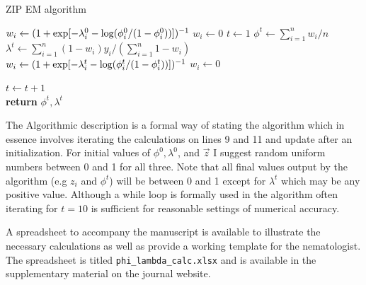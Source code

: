\documentclass{article}
\begin{document}
\begin{algorithm}
\caption{ZIP EM algorithm}\label{alg:zip_em}
\begin{algorithmic}[1]
  		\State $w_i \gets (1+\exp[-\lambda_i^0 -\textnormal{log}(\phi_i^0/(1-\phi_i^0))])^{-1}$ 
	\Else 
  		\State $w_i \gets 0$ 
 	\EndIf
\EndFor
\State $t \gets 1$
\State $\phi^t \gets \sum_{i=1}^nw_i/n $\\
\State $\lambda^t \gets \sum_{i=1}^n(1-w_i)y_i /(\sum_{i=1}^n1-w_i) $\\
  		\State $w_i \gets (1+\exp[-\lambda_i^t -\textnormal{log}(\phi_i^t/(1-\phi_i^t))])^{-1}$ 
	\Else 
  		\State $w_i \gets 0$ 
 	\EndIf
\EndFor

\State $t\gets t+1$\\
\EndWhile
\State \textbf{return} $\phi^t, \lambda^t$\\
\EndProcedure
\end{algorithmic}
\end{algorithm}
The Algorithmic description is a formal way of stating the algorithm which in essence involves iterating the calculations on lines 9 and 11 and update after an initialization. For initial values of $\phi^0, \lambda^0$, and $\vec{z}$ I suggest random uniform numbers between 0 and 1 for all three. Note that all final values output by the algorithm (e.g $z_i$ and $\phi^t$) will be between 0 and 1 except for $\lambda^t$ which may be any positive value. Although a while loop is formally used in the algorithm often iterating for $t=10$ is sufficient for reasonable settings of numerical accuracy. 

A spreadsheet to accompany the manuscript is available to illustrate the necessary calculations as well as provide a working template for the nematologist. The spreadsheet is titled \texttt{phi\_lambda\_calc.xlsx} and is available in the supplementary material on the journal website. 
\end{document}
